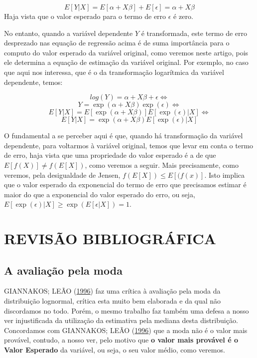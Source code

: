 \documentclass[a4paper]{article}
\begin{document}
\[E[Y|X] = E[\alpha + X\beta] + E[\epsilon] = \alpha + X\beta\] Haja
vista que o valor esperado para o termo de erro \(\epsilon\) é zero.

No entanto, quando a variável dependente \(Y\) é transformada, este
termo de erro desprezado nas equação de regressão acima é de suma
importância para o computo do valor esperado da variável original, como
veremos neste artigo, pois ele determina a equação de estimação da
variável original. Por exemplo, no caso que aqui nos interessa, que é o
da transformação logarítmica da variável dependente, temos:

\[log(Y) = \alpha + X\beta + \epsilon \Leftrightarrow\]
\[Y = \exp(\alpha + X\beta)\exp(\epsilon) \Leftrightarrow\]
\[E[Y|X] = E[\exp(\alpha + X\beta)]E[\exp(\epsilon)|X] \Leftrightarrow\]
\[E[Y|X] = \exp(\alpha + X\beta)E[\exp(\epsilon)|X]\]

O fundamental a se perceber aqui é que, quando há transformação da
variável dependente, para voltarmos à variável original, temos que levar
em conta o termo de erro, haja vista que uma propriedade do valor
esperado é a de que \(E[f(X)] \ne f(E[X])\), como veremos a seguir. Mais
precisamente, como veremos, pela desigualdade de Jensen,
\(f(E[X]) \leq E[(f(x)]\). Isto implica que o valor esperado da
exponencial do termo de erro que precisamos estimar é maior do que a
exponencial do valor esperado do erro, ou seja,
\(E[\exp(\epsilon)|X] \geq \exp(E[\epsilon|X]) = 1\).

\section{REVISÃO BIBLIOGRÁFICA}\label{revisao-bibliografica}

\subsection{A avaliação pela moda}\label{a-avaliacao-pela-moda}

GIANNAKOS; LEÃO (\protect\hyperlink{ref-giannakos}{1996}) faz uma
crítica à avaliação pela moda da distribuição lognormal, crítica esta
muito bem elaborada e da qual não discordamos no todo. Porém, o mesmo
trabalho faz também uma defesa a nosso ver injustificada da utilização
da estimativa pela mediana desta distribuição. Concordamos com
GIANNAKOS; LEÃO (\protect\hyperlink{ref-giannakos}{1996}) que a moda não
é o valor mais provável, contudo, a nosso ver, pelo motivo que \textbf{o
valor mais provável é o Valor Esperado} da variável, ou seja, o seu
valor médio, como veremos.
\end{document}
